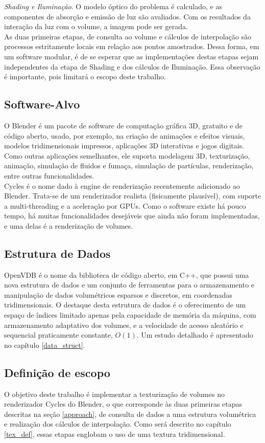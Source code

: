 \documentclass[12pt, a4paper, oneside]{book}
\begin{document}
\emph{Shading e Iluminação}. O modelo óptico do problema é calculado, e as componentes de absorção e emissão de luz são avaliados. Com os resultados da interação da luz com o volume, a imagem pode ser gerada.\\

As duas primeiras etapas, de consulta ao volume e cálculos de interpolação são processos estritamente locais em relação aos pontos amostrados. Dessa forma, em um software modular, é de se esperar que as implementações destas etapas sejam independentes da etapa de Shading e dos cálculos de Iluminação. Essa observação é importante, pois limitará o escopo deste trabalho.

\subsection{Software-Alvo}
O Blender é um pacote de software de computação gráfica 3D, gratuito e de código aberto, usado, por exemplo, na criação de animações e efeitos visuais, modelos tridimensionais impressos, aplicações 3D interativas e jogos digitais. Como outras aplicações semelhantes, ele suporta modelagem 3D, texturização, animação, simulação de fluidos e fumaça, simulação de partículas, renderização, entre outras funcionalidades. \\

Cycles é o nome dado à engine de renderização recentemente adicionado ao Blender. Trata-se de um renderizador realista (fisicamente plausível), com suporte a multi-threading e a aceleração por GPUs. Como o software existe há pouco tempo, há muitas funcionalidades desejáveis que ainda não foram implementadas, e uma delas é a renderização de volumes.

\subsection{Estrutura de Dados}
OpenVDB é o nome da biblioteca de código aberto, em C++, que possui uma nova estrutura de dados e um conjunto de ferramentas para o armazenamento e manipulação de dados volumétricos esparsos e discretos, em coordenadas tridimensionais. O destaque desta estrutura de dados é o oferecimento de um espaço de índices limitado apenas pela capacidade de memória da máquina, com armazenamento adaptativo dos volumes, e a velocidade de acesso aleatório e sequencial praticamente constante, $O(1)$. Um estudo detalhado é apresentado no capítulo \ref{data_struct}.

\subsection{Definição de escopo}
O objetivo deste trabalho é implementar a texturização de volumes no renderizador Cycles do Blender, o que corresponde às duas primeiras etapas descritas na seção \ref{approach}, de consulta de dados a uma estrutura volumétrica e realização dos cálculos de interpolação. Como será descrito no capítulo \ref{tex_def}, essas etapas englobam o uso de uma textura tridimensional.\\
\end{document}
